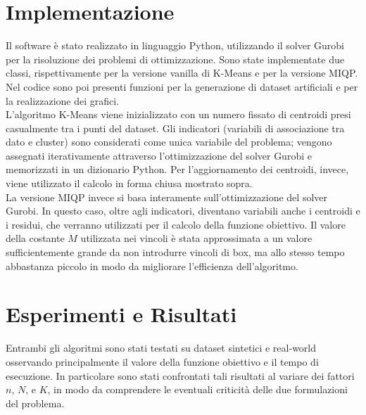 \documentclass{article}
\begin{document}
    \section{Implementazione}
    Il software è stato realizzato in linguaggio Python, utilizzando il solver Gurobi per la risoluzione dei problemi di ottimizzazione. Sono state implementate due classi, rispettivamente per la versione vanilla di K-Means e per la versione MIQP. Nel codice sono poi presenti funzioni per la generazione di dataset artificiali e per la realizzazione dei grafici.\\
    L'algoritmo K-Means viene inizializzato con un numero fissato di centroidi presi casualmente tra i punti del dataset. Gli indicatori (variabili di associazione tra dato e cluster) sono considerati come unica variabile del problema; vengono assegnati iterativamente attraverso l'ottimizzazione del solver Gurobi e memorizzati in un dizionario Python. Per l'aggiornamento dei centroidi, invece, viene utilizzato il calcolo in forma chiusa mostrato sopra.\\
    La versione MIQP invece si basa interamente sull'ottimizzazione del solver Gurobi. In questo caso, oltre agli indicatori, diventano variabili anche i centroidi e i residui, che verranno utilizzati per il calcolo della funzione obiettivo. Il valore della costante $M$ utilizzata nei vincoli è stata approssimata a un valore sufficientemente grande da non introdurre vincoli di box, ma allo stesso tempo abbastanza piccolo in modo da migliorare l'efficienza dell'algoritmo.\\

    \section{Esperimenti e Risultati}
    Entrambi gli algoritmi sono stati testati su dataset sintetici e real-world osservando principalmente il valore della funzione obiettivo e il tempo di esecuzione. In particolare sono stati confrontati tali risultati al variare dei fattori $n$, $N$, e $K$, in modo da comprendere le eventuali criticità delle due formulazioni del problema.\\
\end{document}
